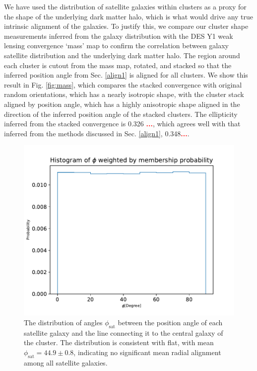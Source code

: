 \documentclass[fleqn,usenatbib]{mnras}
\newcommand{\verify}[1]{\textcolor{red}{\textbf{{#1}}}}
\begin{document}
We have used the distribution of satellite galaxies within clusters as a proxy for the shape of the underlying dark matter halo, which is what would drive any true intrinsic alignment of the galaxies. To justify this, we compare our cluster shape measurements inferred from the galaxy distribution with the DES Y1 weak lensing convergence `mass' map to confirm the correlation between galaxy satellite distribution and the underlying dark matter halo. The region around each cluster is cutout from the mass map, rotated, and stacked so that the inferred position angle from Sec. \ref{align1} is aligned for all clusters. We show this result in Fig. \ref{fig:mass}, which compares the stacked convergence with original random orientations, which has a nearly isotropic shape, with the cluster stack aligned by position angle, which has a highly anisotropic shape aligned in the direction of the inferred position angle of the stacked clusters. The ellipticity inferred from the stacked convergence is 0.326 \verify{...}, which agrees well with that inferred from the methods discussed in Sec. \ref{align1}, 0.348\verify{...}.

\begin{figure}
\begin{center}
\includegraphics[width=\columnwidth]{phi_hist.pdf}
\end{center}
\caption[]{The distribution of angles $\phi_{\mathrm{sat}}$ between the position angle of each satellite galaxy and the line connecting it to the central galaxy of the cluster. The distribution is consistent with flat, with mean $\phi_{\mathrm{sat}}=44.9\pm 0.8$\textdegree, indicating no significant mean radial alignment among all satellite galaxies. 
\label{fig:phisat}}
\end{figure}
\end{document}
